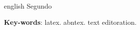 \begin{resumo}[Abstract]
 \begin{otherlanguage*}{english}
   Segundo 

   \vspace{\onelineskip}
 
   \noindent 
   \textbf{Key-words}: latex. abntex. text editoration.
 \end{otherlanguage*}
\end{resumo}